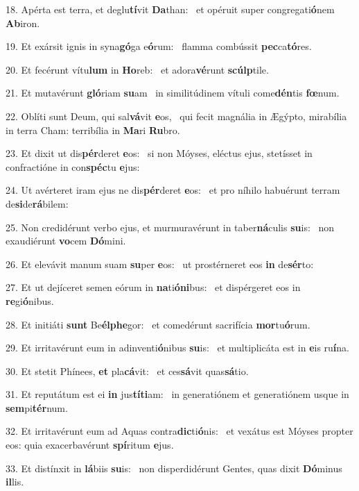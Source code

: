 18. Apérta est terra, et deglu\textbf{tí}vit \textbf{Da}than: \ast\  et opéruit super congregati\textbf{ó}nem \textbf{Ab}iron.\

19. Et exársit ignis in syna\textbf{gó}ga e\textbf{ó}rum: \ast\  flamma combússit \textbf{pec}ca\textbf{tó}res.\

20. Et fecérunt vítu\textbf{lum} in \textbf{Ho}reb: \ast\  et adora\textbf{vé}runt \textbf{scúlp}tile.\

21. Et mutavérunt \textbf{gló}riam \textbf{su}am \ast\  in similitúdinem vítuli come\textbf{dén}tis \textbf{fœ}num.\

22. Oblíti sunt Deum, qui sal\textbf{vá}vit \textbf{e}os, \ast\  qui fecit magnália in Ægýpto, mirabília in terra Cham: terribília in \textbf{Ma}ri \textbf{Ru}bro.\

23. Et dixit ut dis\textbf{pér}deret \textbf{e}os: \ast\  si non Móyses, eléctus ejus, stetísset in confractióne in con\textbf{spéc}tu \textbf{e}jus:\

24. Ut avérteret iram ejus ne dis\textbf{pér}deret \textbf{e}os: \ast\  et pro níhilo habuérunt terram de\textbf{si}de\textbf{rá}bilem:\

25. Non credidérunt verbo ejus, et murmuravérunt in taber\textbf{ná}culis \textbf{su}is: \ast\  non exaudiérunt \textbf{vo}cem \textbf{Dó}mini.\

26. Et elevávit manum suam \textbf{su}per \textbf{e}os: \ast\  ut prostérneret eos \textbf{in} de\textbf{sér}to:\

27. Et ut dejíceret semen eórum in \textbf{na}ti\textbf{ó}\textbf{ni}bus: \ast\  et dispérgeret eos in \textbf{re}gi\textbf{ó}nibus.\

28. Et initiáti \textbf{sunt} Be\textbf{él}\textbf{phe}gor: \ast\  et comedérunt sacrifícia \textbf{mor}tu\textbf{ó}rum.\

29. Et irritavérunt eum in adinventi\textbf{ó}nibus \textbf{su}is: \ast\  et multiplicáta est in \textbf{e}is ru\textbf{í}na.\

30. Et stetit Phínees, \textbf{et} pla\textbf{cá}vit: \ast\  et ces\textbf{sá}vit quas\textbf{sá}tio.\

31. Et reputátum est ei \textbf{in} jus\textbf{tí}\textbf{ti}am: \ast\  in generatiónem et generatiónem usque in \textbf{sem}pi\textbf{tér}num.\

32. Et irritavérunt eum ad Aquas contra\textbf{dic}ti\textbf{ó}nis: \ast\  et vexátus est Móyses propter eos: quia exacerbavérunt \textbf{spí}ritum \textbf{e}jus.\

33. Et distínxit in \textbf{lá}biis \textbf{su}is: \ast\  non disperdidérunt Gentes, quas dixit \textbf{Dó}minus \textbf{il}lis.\

